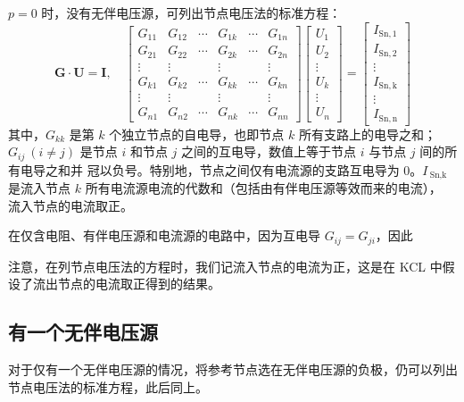 \documentclass[UTF8]{report}
\def\I{\mathscr{I}}
\theoremstyle{MyLineTheoremStyle} %
\theoremstyle{MyBlockTheoremStyle} %
\theoremstyle{MySubsubsectionStyle} %
\begin{document}
$p = 0$ 时，没有无伴电压源，可列出节点电压法的标准方程：
\begin{equation}
    \boldsymbol{G}\cdot \boldsymbol{U} = \boldsymbol{I},\quad 
    \begin{bmatrix}
        G_{11}&G_{12}&\cdots&G_{1k}&\cdots&G_{1n}\\G_{21}&G_{22}&\cdots&G_{2k}&\cdots&G_{2n}\\\vdots&\vdots&&\vdots&&\vdots\\G_{k1}&G_{k2}&\cdots&G_{kk}&\cdots&G_{kn}\\\vdots&\vdots&&\vdots&&\vdots\\G_{n1}&G_{n2}&\cdots&G_{nk}&\cdots&G_{nn}\end{bmatrix}\begin{bmatrix}U_{1}\\U_{2}\\\vdots\\U_{k}\\\vdots\\U_{n}\end{bmatrix}=\begin{bmatrix}I_{\mathrm{Sn, 1}}\\I_{\mathrm{Sn, 2}}\\\vdots\\I_{\mathrm{Sn, k}}\\\vdots\\I_{\mathrm{Sn, n}}
    \end{bmatrix}
\end{equation}
其中，$G_{kk}$ 是第 $k$ 个独立节点的自电导，也即节点 $k$ 所有支路上的电导之和；$G_{ij}\ (i \ne j)$ 是节点 $i$ 和节点 $j$ 之间的互电导，数值上等于节点 $i$ 与节点 $j$ 间的所有电导之和并 {\color{red} 冠以负号}。特别地，节点之间仅有电流源的支路互电导为 0。$I_{\ \text{Sn,k}}$ 是流入节点 $k$ 所有电流源电流的代数和（包括由有伴电压源等效而来的电流），{\color{red} 流入节点的电流取正}。

在仅含电阻、有伴电压源和电流源的电路中，因为互电导 $G_{ij} = G_{ji}$，因此

注意，在列节点电压法的方程时，我们记流入节点的电流为正，这是在 KCL 中假设了流出节点的电流取正得到的结果。

\subsection{有一个无伴电压源}

对于仅有一个无伴电压源的情况，将参考节点选在无伴电压源的负极，仍可以列出节点电压法的标准方程，此后同上。
\end{document}
